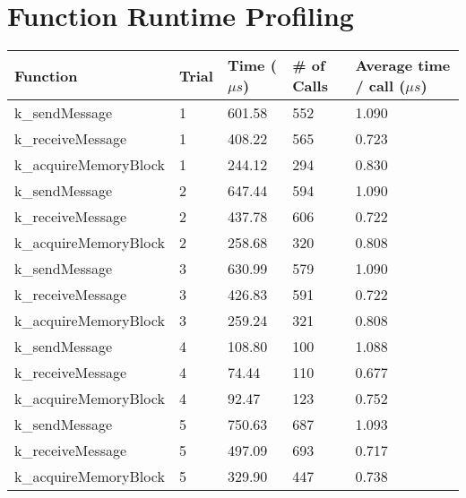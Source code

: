 \documentclass[12pt]{report}
\begin{document}
\section{Function Runtime Profiling}
\begin{tabular}{l | l | l | l | l}
    Function & Trial & Time ($\mu s$) & \# of Calls & Average time / call ($\mu s$) \\
    \hline
    k\_sendMessage&1&601.58&552&1.090 \\
    k\_receiveMessage&1&408.22&565&0.723 \\
    k\_acquireMemoryBlock&1&244.12&294&0.830 \\
    k\_sendMessage&2&647.44&594&1.090 \\
    k\_receiveMessage&2&437.78&606&0.722 \\
    k\_acquireMemoryBlock&2&258.68&320&0.808 \\
    k\_sendMessage&3&630.99&579&1.090 \\
    k\_receiveMessage&3&426.83&591&0.722 \\
    k\_acquireMemoryBlock&3&259.24&321&0.808 \\
    k\_sendMessage&4&108.80&100&1.088 \\
    k\_receiveMessage&4&74.44&110&0.677 \\
    k\_acquireMemoryBlock&4&92.47&123&0.752 \\
    k\_sendMessage&5&750.63&687&1.093 \\
    k\_receiveMessage&5&497.09&693&0.717 \\
    k\_acquireMemoryBlock&5&329.90&447&0.738 \\
\end{tabular}
\end{document}
